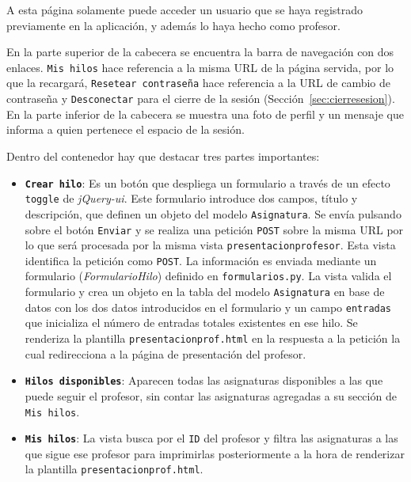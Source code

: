 \documentclass[a4paper, 12pt]{book}
\begin{document}
A esta p\'agina solamente puede acceder un usuario que se haya registrado previamente en la aplicaci\'on, y adem\'as lo haya hecho como profesor.

En la parte superior de la cabecera se encuentra la barra de navegaci\'on con dos enlaces. \texttt{Mis hilos} hace referencia a la misma URL de la 
p\'agina servida, por lo que la recargar\'a, \texttt{Resetear contrase\~na} hace referencia a la URL de cambio de contrase\~na y \texttt{Desconectar} para el cierre de la sesi\'on (Secci\'on~\ref{sec:cierresesion}). En la parte inferior 
de la cabecera se muestra una foto de perfil y un mensaje que informa a quien pertenece el espacio de la sesi\'on.

Dentro del contenedor hay que destacar tres partes importantes:
\begin{itemize}
  \item {\bfseries \texttt{Crear hilo}}: Es un bot\'on que despliega un formulario a trav\'es de un efecto \texttt{toggle} de \textit{jQuery-ui}. Este 
  formulario introduce dos campos, t\'itulo y descripci\'on, que definen un objeto del modelo \texttt{Asignatura}. Se env\'ia pulsando sobre el bot\'on
  \texttt{Enviar} y se realiza una petici\'on \texttt{POST} sobre la misma URL por lo que ser\'a procesada por la misma vista \texttt{presentacionprofesor}.
  Esta vista identifica la petici\'on como \texttt{POST}. La informaci\'on es enviada mediante un formulario (\textit{FormularioHilo}) definido en 
  \texttt{formularios.py}. La vista valida el formulario y crea un objeto en la tabla del modelo \texttt{Asignatura} en base de datos con los dos datos 
  introducidos en el formulario y un campo \texttt{entradas} que inicializa el n\'umero de entradas totales existentes en ese hilo. Se renderiza 
  la plantilla \texttt{presentacionprof.html} en la respuesta a la petici\'on la cual redirecciona a la p\'agina de presentaci\'on del profesor. 
  \item {\bfseries \texttt{Hilos disponibles}}: Aparecen todas las asignaturas disponibles a las que puede seguir el profesor, sin contar las asignaturas
  agregadas a su secci\'on de \texttt{Mis hilos}.
  \item {\bfseries \texttt{Mis hilos}}: La vista busca por el \texttt{ID} del profesor y filtra las asignaturas a las que sigue ese profesor para 
  imprimirlas posteriormente a la hora de renderizar la plantilla \texttt{presentacionprof.html}.
\end{itemize}
\end{document}
